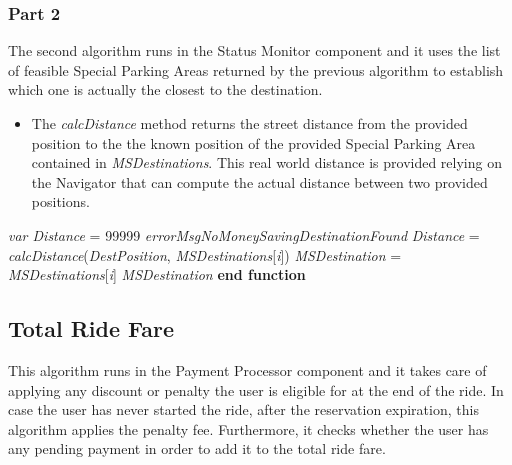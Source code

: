 \subsubsection{Part 2}

The second algorithm runs in the Status Monitor component and it uses the list of feasible Special Parking Areas returned by the previous algorithm to establish which one is actually the closest to the destination.

\begin{itemize}
    \item The \textit{calcDistance} method returns the street distance from the provided position to the the known position of the provided Special Parking Area contained in \textit{MSDestinations}. This real world distance is provided relying on the Navigator that can compute the actual distance between two provided positions.
\end{itemize}

\begin{algorithm}
\caption{}\label{euclid}
\begin{algorithmic}[1]
\State \textit{var Distance} = 99999
\State\Return \textit{errorMsgNoMoneySavingDestinationFound}
\EndIf
{}
\State \textit{Distance} = \textit{calcDistance}(\textit{DestPosition}, \textit{MSDestinations}[\textit{i}])
\State \textit{MSDestination} = \textit{MSDestinations}[\textit{i}]
\EndIf
\EndFor
\State\Return \textit{MSDestination}
\EndFunction
\State \textbf{end function}
\end{algorithmic}
\end{algorithm}

\newpage


\subsection{Total Ride Fare}
This algorithm runs in the Payment Processor component and it takes care of applying any discount or penalty the user is eligible for at the end of the ride. In case the user has never started the ride, after the reservation expiration, this algorithm applies the penalty fee. Furthermore, it checks whether the user has any pending payment in order to add it to the total ride fare.

